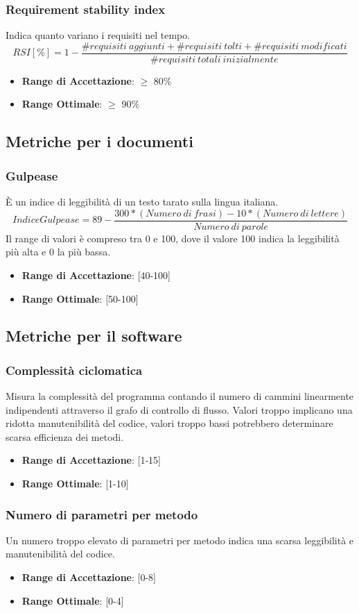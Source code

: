 \documentclass[12pt,a4paper]{article}
\begin{document}
\subsubsection{Requirement stability index}
Indica quanto variano i requisiti nel tempo.
\[RSI[\%]= 1 - \frac{\#requisiti\ aggiunti+\#requisiti\ tolti+\#requisiti\ modificati}{\#requisiti\ totali\ inizialmente}\]
\begin{itemize}
	\item \textbf{Range di Accettazione}: $\geq$ 80\%
	\item \textbf{Range Ottimale}: $\geq$ 90\%
\end{itemize}
\subsection{Metriche per i documenti}\label{metriche_doc}
\subsubsection{Gulpease}
È un indice di leggibilità di un testo tarato sulla lingua italiana.
\[IndiceGulpease=89-\frac{300*(Numero\ di\ frasi)-10*(Numero\ di\ lettere)}{Numero\ di\ parole}\]
Il range di valori è compreso tra 0 e 100, dove il valore 100 indica la leggibilità più alta e 0 la più bassa.
\begin{itemize}
\item \textbf{Range di Accettazione}: [40-100]
\item \textbf{Range Ottimale}: [50-100]
\end{itemize}
\subsection{ Metriche per il software}\label{metriche_sw}
\subsubsection{Complessità ciclomatica}
Misura la complessità del programma contando il numero di cammini linearmente indipendenti attraverso il grafo di controllo di flusso. Valori troppo implicano una ridotta manutenibilità del codice, valori troppo bassi potrebbero determinare scarsa efficienza dei metodi.
\begin{itemize}
\item \textbf{Range di Accettazione}: [1-15]
\item \textbf{Range Ottimale}: [1-10]
\end{itemize}
\subsubsection{Numero di parametri per metodo}
Un numero troppo elevato di parametri per metodo indica una scarsa leggibilità e manutenibilità del codice.
\begin{itemize}
\item \textbf{Range di Accettazione}: [0-8]
\item \textbf{Range Ottimale}: [0-4]
\end{itemize}
\end{document}
